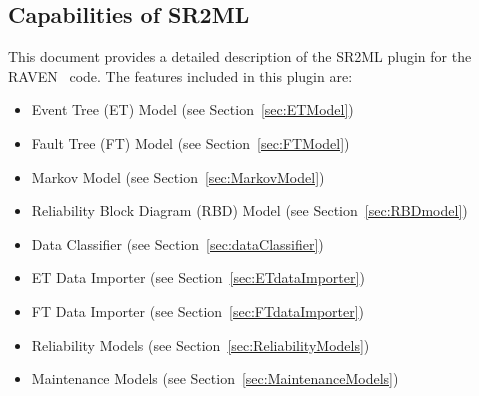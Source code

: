\subsection{Capabilities of SR2ML}
This document provides a detailed description of the SR2ML plugin for the RAVEN~\cite{RAVEN,RAVENtheoryMan} code.
The features included in this plugin are:
\begin{itemize}
	\item Event Tree (ET) Model (see Section~\ref{sec:ETModel})
	\item Fault Tree (FT) Model (see Section~\ref{sec:FTModel})
	\item Markov Model (see Section~\ref{sec:MarkovModel})
	\item Reliability Block Diagram (RBD) Model (see Section~\ref{sec:RBDmodel})
	\item Data Classifier (see Section~\ref{sec:dataClassifier})
	\item ET Data Importer (see Section~\ref{sec:ETdataImporter})
	\item FT Data Importer (see Section~\ref{sec:FTdataImporter})
	\item Reliability Models (see Section~\ref{sec:ReliabilityModels})
  \item Maintenance Models (see Section~\ref{sec:MaintenanceModels})
\end{itemize}
